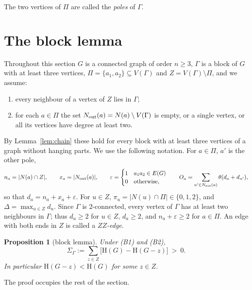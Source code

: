 \documentclass[11pt]{article}
\newtheorem{proposition}[theorem]{Proposition}
\theoremstyle{definition}
\theoremstyle{remark}
\newcommand{\Hm}{\mathrm{H}}
\newcommand{\tht}{\theta}
\begin{document}
The two vertices of $\Pi$ are called the \emph{poles} of $\Gamma$.

\section{The block lemma}\label{sec:block}

Throughout this section $G$ is a connected graph of order $n\ge3$, $\Gamma$ is a block of $G$
with at least three vertices, $\Pi=\{a_1,a_2\}\subseteq V(\Gamma)$ and
$Z=V(\Gamma)\setminus\Pi$, and we assume:
\begin{enumerate}[label=\textup{(B\arabic*)}]
\item every neighbour of a vertex of $Z$ lies in $\Gamma$;
\item for each $a\in\Pi$ the set $N_{\rm out}(a)=N(a)\setminus V(\Gamma)$ is empty, or a single
 vertex, or all its vertices have degree at least two.
\end{enumerate}
By Lemma~\ref{lem:chain} these hold for every block with at least three vertices of a graph
without hanging parts. We use the following notation. For $a\in\Pi$, $a'$ is the other pole,
\[
 n_a=|N(a)\cap Z|,\qquad x_a=|N_{\rm out}(a)|,\qquad \varepsilon=\begin{cases}1&a_1a_2\in E(G)\\0&\text{otherwise,}\end{cases}
 \qquad O_a=\sum_{u'\in N_{\rm out}(a)}\tht(d_a+d_{u'}),
\]
so that $d_a=n_a+x_a+\varepsilon$. For $u\in Z$, $\pi_u=|N(u)\cap\Pi|\in\{0,1,2\}$, and
$\Delta=\max_{u\in Z}d_u$. Since $\Gamma$ is $2$-connected, every vertex of $\Gamma$ has at
least two neighbours in $\Gamma$; thus $d_u\ge2$ for $u\in Z$, $d_a\ge2$, and
$n_a+\varepsilon\ge2$ for $a\in\Pi$. An edge with both ends in $Z$ is called a
\emph{$ZZ$-edge}.

\begin{proposition}[block lemma]\label{prop:block}
Under \textup{(B1)} and \textup{(B2)},
\[
 \Sigma_\Gamma:=\sum_{z\in Z}\bigl[\Hm(G)-\Hm(G-z)\bigr]\ >\ 0 .
\]
In particular $\Hm(G-z)<\Hm(G)$ for some $z\in Z$.
\end{proposition}

The proof occupies the rest of the section.
\end{document}
